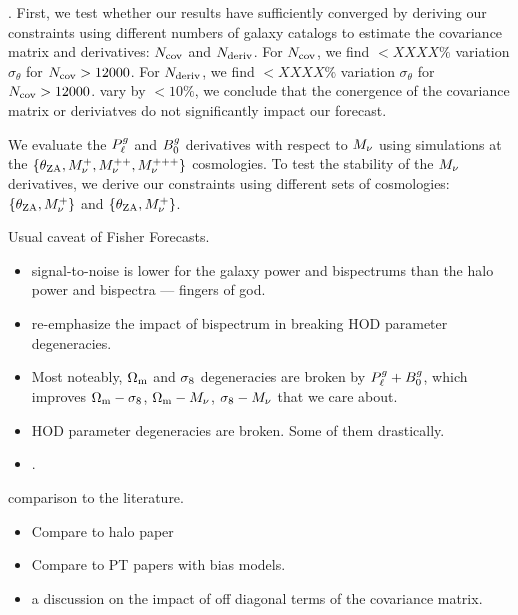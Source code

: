 . 
First, we test whether our results have sufficiently converged by deriving our 
constraints using different numbers of galaxy catalogs to estimate the covariance 
matrix and derivatives: $N_{\rm cov}$ and $N_{\rm deriv}$. For $N_{\rm cov}$,
we find $< XXXX\%$ variation $\sigma_\theta$ for $N_{\rm cov} > 12000$.
For $N_{\rm deriv}$, 
we find $< XXXX\%$ variation $\sigma_\theta$ for $N_{\rm cov} > 12000$.
vary by $< 10\%$, we conclude that the conergence of the covariance matrix or
deriviatves do not significantly impact our forecast. 

We evaluate the $P^g_{\ell}$ and $B^g_0$ derivatives with respect to $M_\nu$ using
simulations at the $\{\theta_{\rm ZA}, M_\nu^+, M_\nu^{++}, M_\nu^{+++}\}$
cosmologies. To test the stability of the $M_\nu$ derivatives, we derive our
constraints using different sets of cosmologies: $\{\theta_{\rm ZA}, M_\nu^+\}$ 
and $\{\theta_{\rm ZA}, M_\nu^+\}$. 

Usual caveat of Fisher Forecasts. 


\begin{itemize}
    \item signal-to-noise is lower for the galaxy power and bispectrums than
        the halo power and bispectra --- fingers of god. 
    \item re-emphasize the impact of bispectrum in breaking HOD parameter
        degeneracies. 
    \item Most noteably, $\Omega_{\rm m}$ and $\sigma_8$ degeneracies are broken by
        $P^g_{\ell} + B^g_0$, which improves $\Omega_{\rm m} - \sigma_8$, $\Omega_{\rm m} - M_\nu$,
        $\sigma_8-M_\nu$ that we care about. 
    \item HOD parameter degeneracies are broken. Some of them drastically.
    \item {}.
\end{itemize}

comparison to the literature.
\begin{itemize}
    \item Compare to halo paper 
    \item Compare to PT papers with bias models. 
    \item a discussion on the impact of off diagonal terms of the covariance matrix. 
\end{itemize} 

